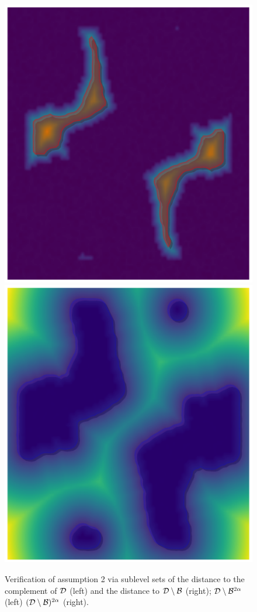 \begin{figure}[htbp]
\centering
    \includegraphics[scale=0.8]{figures/hsn_close_1.pdf}\hspace{0.5in}
    \includegraphics[scale=0.8]{figures/hsn_close_2.pdf}
    \caption{Verification of assumption 2 via sublevel sets of the distance to the complement of ${\mathcal{D}}$ (left) and the distance to ${\mathcal{D}}\setminus{\mathcal{B}}$ (right);
            ${\mathcal{D}}\setminus{\mathcal{B}}^{2\alpha}$ (left) $({\mathcal{D}}\setminus{\mathcal{B}})^{2\alpha}$ (right).}
    \label{fig:hsn_close}
\end{figure}

